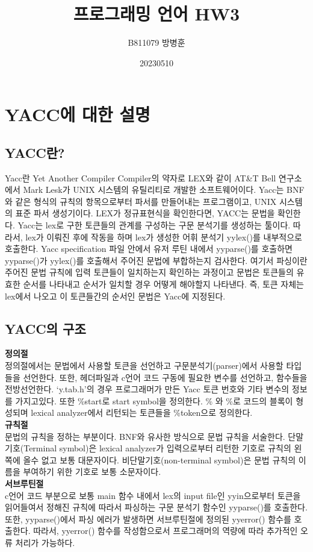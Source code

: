 \documentclass{article}
\title{프로그래밍 언어 HW3}
\author{B811079 방병훈}
\date{20230510}
\begin{document}
\maketitle
\section{YACC에 대한 설명}
\subsection{YACC란?}
Yacc란 Yet Another Compiler Compiler의 약자로 LEX와 같이 AT\&T Bell 연구소에서 Mark Lesk가 UNIX 시스템의 유틸리티로 개발한 소프트웨어이다. Yacc는 BNF와 같은 형식의 규칙의 항목으로부터 파서를 만들어내는 프로그램이고, UNIX 시스템의 표준 파서 생성기이다. LEX가 정규표현식을 확인한다면, YACC는 문법을 확인한다. Yacc는 lex로 구한 토큰들의 관계를 구성하는 구문 분석기를 생성하는 툴이다. 따라서, lex가 이뤄진 후에 작동을 하며 lex가 생성한 어휘 분석기 yylex()를 내부적으로 호출한다. Yacc specification 파일 안에서 유저 루틴 내에서 yyparse()를 호출하면 yyparse()가 yylex()를 호출해서 주어진 문법에 부합하는지 검사한다. 여기서 파싱이란 주어진 문법 규칙에 입력 토큰들이 일치하는지 확인하는 과정이고 문법은 토큰들의 유효한 순서를 나타내고 순서가 일치할 경우 어떻게 해야할지 나타낸다. 즉, 토큰 자체는 lex에서 나오고 이 토큰들간의 순서인 문법은 Yacc에 지정된다. 

\subsection{YACC의 구조}
{\bf 정의절}\\
정의절에서는 문법에서 사용할 토큰을 선언하고 구문분석기(parser)에서 사용할 타입들을 선언한다. 또한, 헤더파일과 c언어 코드 구동에 필요한 변수를 선언하고, 함수들을 전방선언한다. ‘y.tab.h’의 경우 프로그래머가 만든 Yacc 토큰 번호와 기타 변수의 정보를 가지고있다. 또한 \%start로 start symbol을 정의한다. \%{ 와 \%}로 코드의 블록이 형성되며 lexical analyzer에서 리턴되는 토큰들을 \%token으로 정의한다.\\
{\bf 규칙절}\\
문법의 규칙을 정하는 부분이다. BNF와 유사한 방식으로 문법 규칙을 서술한다. 단말기호(Terminal symbol)은 lexical analyzer가 입력으로부터 리턴한 기호로 규칙의 왼쪽에 올수 없고 보통 대문자이다. 비단말기호(non-terminal symbol)은 문법 규칙의 이름을 부여하기 위한 기호로 보통 소문자이다.\\
{\bf 서브루틴절}\\
c언어 코드 부분으로 보통 main 함수 내에서 lex의 input file인 yyin으로부터 토큰을 읽어들여서 정해진 규칙에 따라서 파싱하는 구문 분석기 함수인 yyparse()를 호출한다. 또한, yyparse()에서 파싱 에러가 발생하면 서브루틴절에 정의된 yyerror() 함수를 호출한다. 따라서, yyerror() 함수를 작성함으로서 프로그래머의 역량에 따라 추가적인 오류 처리가 가능하다. 
\end{document}
